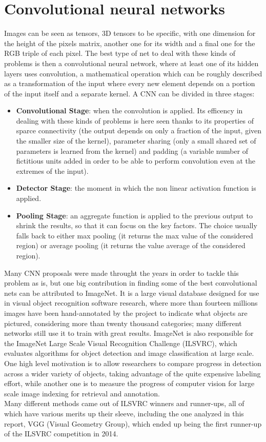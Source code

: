 \documentclass[12pt,a4paper]{report}
\begin{document}
\section{Convolutional neural networks}
Images can be seen as tensors, 3D tensors to be specific, with one dimension for the height of the pixels matrix, another one for its width and a final one for the RGB triple of each pixel. The best type of net to deal with these kinds of problems is then a convolutional neural network, where at least one of its hidden layers uses convolution, a mathematical operation which can be roughly described as a transformation of the input where every new element depends on a portion of the input itself and a separate kernel. A CNN can be divided in three stages:
\begin{itemize}
\item \textbf{Convolutional Stage}: when the convolution is applied. Its efficency in dealing with these kinds of problems is here seen thanks to its properties of sparce connectivity (the output depends on only a fraction of the input, given the smaller size of the kernel), parameter sharing (only a small shared set of parameters is learned from the kernel) and padding (a variable number of fictitious units added in order to be able to perform convolution even at the extremes of the input).
\item \textbf{Detector Stage}: the moment in which the non linear activation function is applied.
\item \textbf{Pooling Stage}: an aggregate function is applied to the previous output to shrink the results, so that it can focus on the key factors. The choice usually falls back to either max pooling (it returns the max value of the considered region) or average pooling (it returns the value average of the considered region).
\end{itemize}
Many CNN proposals were made throught the years in order to tackle this problem as is, but one big contribution in finding some of the best convolutional nets can be attributed to ImageNet. It is a large visual database designed for use in visual object recognition software research, where more than fourteen millions images have been hand-annotated by the project to indicate what objects are pictured, considering more than twenty thousand categories; many different networks still use it to train with great results. ImageNet is also responsible for the ImageNet Large Scale Visual Recognition Challenge (ILSVRC), which evaluates algorithms for object detection and image classification at large scale. One high level motivation is to allow researchers to compare progress in detection across a wider variety of objects, taking advantage of the quite expensive labeling effort, while another one is to measure the progress of computer vision for large scale image indexing for retrieval and annotation. \\
Many different methods came out of ILSVRC winners and runner-ups, all of which have various merits up their sleeve, including the one analyzed in this report, VGG (Visual Geometry Group), which ended up being the first runner-up of the ILSVRC competition in 2014.
\end{document}
